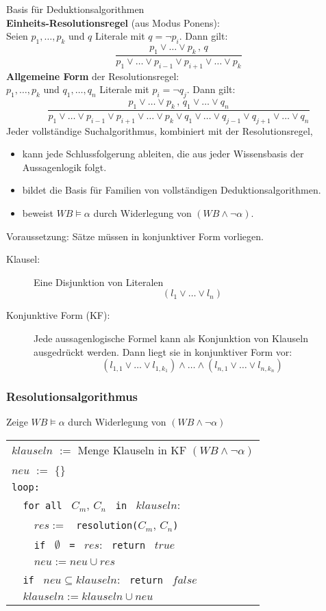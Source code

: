 Basis für Deduktionsalgorithmen \\
\textbf{Einheits-Resolutionsregel} (aus Modus Ponens): \\ Seien $p_1,\dots,p_k$ und $q$ Literale mit $q = \neg p_i$. Dann gilt: $$\frac{p_1 \vee \dots \vee p_k \, , \, q}{p_1 \vee \dots \vee p_{i-1} \vee p_{i+1} \vee \dots \vee p_k}$$
\textbf{Allgemeine Form} der Resolutionsregel: \\ $p_1,\dots,p_k$ und $q_1,\dots,q_n$ Literale mit $p_i = \neg q_j$. Dann gilt: $$\frac{p_1 \vee \dots \vee p_k \, , \, q_1 \vee \dots \vee q_n}{p_1 \vee \dots \vee p_{i-1} \vee p_{i+1} \vee \dots \vee p_k \vee q_1 \vee \dots \vee q_{j-1} \vee q_{j+1} \vee \dots \vee q_n}$$
Jeder vollständige Suchalgorithmus, kombiniert mit der Resolutionsregel,
\begin{itemize}
\item kann jede Schlussfolgerung ableiten, die aus jeder Wissensbasis der Aussagenlogik folgt.
\item bildet die Basis für Familien von vollständigen Deduktionsalgorithmen.
\item beweist $WB \models \alpha$ durch Widerlegung von $(WB \wedge \neg \alpha)$.
\end{itemize}
Voraussetzung: Sätze müssen in konjunktiver Form vorliegen.
\begin{description}
\item[Klausel:] Eine Disjunktion von Literalen $$(l_1 \vee \dots \vee l_n)$$
\item[Konjunktive Form (KF):] Jede aussagenlogische Formel kann als Konjunktion von Klauseln ausgedrückt werden. Dann liegt sie in konjunktiver Form vor: $$(l_{1,1} \vee \dots \vee l_{1,k_1}) \wedge \dots \wedge (l_{n,1} \vee \dots \vee l_{n,k_n})$$
\end{description}

\subsubsection{Resolutionsalgorithmus}

Zeige $WB \models \alpha$ durch Widerlegung von $(WB \wedge \neg \alpha)$
\begin{center}
\begin{tabular}{l}
$klauseln$ $:=$ Menge Klauseln in KF $(WB \wedge \neg \alpha)$ \\
$neu$ $:=$ $\{\}$ \\
\verb|loop:| \\
\verb|  for all | $C_m$, $C_n$ \verb| in | $klauseln$: \\
\verb|    |$res :=$ \verb| resolution(|$C_m$, $C_n$\verb|)| \\
\verb|    if | $\emptyset$ \verb| = | $res$: \verb| return | $true$ \\
\verb|    |$neu := neu \cup res$ \\
\verb|  if | $neu \subseteq klauseln$: \verb| return | $false$ \\
\verb|  |$klauseln := klauseln \cup neu$
\end{tabular}
\end{center}

